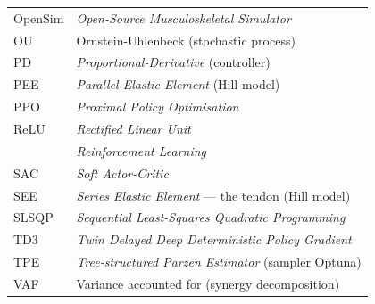 {\begin{tabularx}{\textwidth}{@{} L{2.8cm} X @{} }
OpenSim  & \textit{Open-Source Musculoskeletal Simulator} \\
OU       & Ornstein-Uhlenbeck (stochastic process) \\
PD       & \textit{Proportional-Derivative} (controller) \\
PEE      & \textit{Parallel Elastic Element} (Hill model) \\
PPO      & \textit{Proximal Policy Optimisation} \\
ReLU     & \textit{Rectified Linear Unit} \\
\RL{}    & \textit{Reinforcement Learning} \\
SAC      & \textit{Soft Actor-Critic} \\
SEE      & \textit{Series Elastic Element} --- the tendon (Hill model) \\
SLSQP    & \textit{Sequential Least-Squares Quadratic Programming} \\
TD3      & \textit{Twin Delayed Deep Deterministic Policy Gradient} \\
TPE      & \textit{Tree-structured Parzen Estimator} (sampler Optuna) \\
VAF      & Variance accounted for (synergy decomposition) \\
\bottomrule
\end{tabularx}
}


